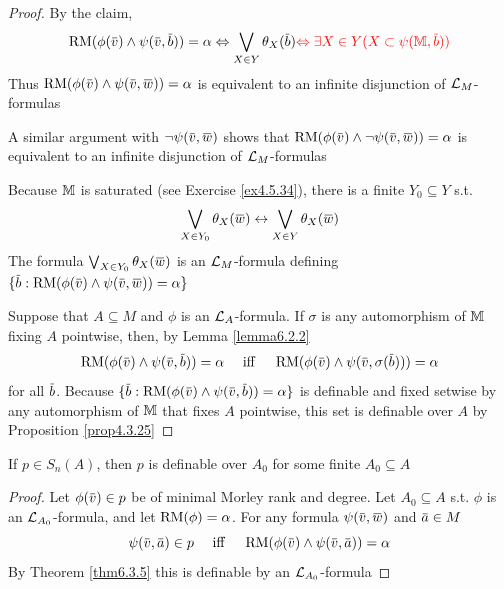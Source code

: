 \documentclass[11pt]{article}
\begin{document}
\begin{proof}
By the claim,
\begin{equation*}
\RM(\phi(\barv)\wedge\psi(\barv,\barb))=\alpha\Leftrightarrow\bigvee_{X\in Y}\theta_X(\barb)\wu{\Leftrightarrow\exists X\in Y(X\subset\psi(\M,\barb))}
\end{equation*}
Thus \(\RM(\phi(\barv)\wedge\psi(\barv,\barw))=\alpha\) is equivalent to an infinite disjunction
of \(\mathcal{L}_M\)-formulas

A similar argument with \(\neg\psi(\barv,\barw)\) shows that \(\RM(\phi(\barv)\wedge\neg\psi(\barv,\barw))=\alpha\) is
equivalent to an infinite disjunction of \(\mathcal{L}_M\)-formulas

Because \(\mathbb{M}\) is saturated (see Exercise \ref{ex4.5.34}), there is a finite \(Y_0\subseteq Y\) s.t.
\begin{equation*}
\bigvee_{X\in Y_0}\theta_X(\barw)\leftrightarrow\bigvee_{X\in Y}\theta_X(\barw)
\end{equation*}
The formula \(\bigvee_{X\in Y_0}\theta_X(\barw)\) is an \(\mathcal{L}_M\)-formula
defining \(\{\barb:\RM(\phi(\barv)\wedge\psi(\barv,\barw))=\alpha\}\)

Suppose that \(A\subseteq M\) and \(\phi\) is an \(\mathcal{L}_A\)-formula. If \(\sigma\) is any automorphism of \(\mathbb{M}\)
fixing \(A\) pointwise, then, by Lemma \ref{lemma6.2.2}
\begin{equation*}
\RM(\phi(\barv)\wedge\psi(\barv,\barb))=\alpha \quad\text{ iff }\quad \RM(\phi(\barv)\wedge\psi(\barv,\sigma(\barb)))=\alpha
\end{equation*}
for all \(\barb\). Because \(\{\barb:\RM(\phi(\barv)\wedge\psi(\barv,\barb))=\alpha\}\) is definable and fixed
setwise by any automorphism of \(\mathbb{M}\) that fixes \(A\) pointwise, this set is definable
over \(A\) by Proposition \ref{prop4.3.25}
\end{proof}

\begin{corollary}[]
If \(p\in S_n(A)\), then \(p\) is definable over \(A_0\) for some finite \(A_0\subseteq A\)
\end{corollary}

\begin{proof}
Let \(\phi(\barv)\in p\) be of minimal Morley rank and degree. Let \(A_0\subseteq A\) s.t. \(\phi\) is
an \(\mathcal{L}_{A_0}\)-formula, and let \(\operatorname{RM}(\phi)=\alpha\). For any formula \(\psi(\barv,\barw)\)
and \(\bara\in M\)
\begin{equation*}
\psi(\barv,\bara)\in p \quad\text{ iff }\quad
\RM(\phi(\barv)\wedge\psi(\barv,\bara))=\alpha
\end{equation*}
By Theorem \ref{thm6.3.5} this is definable by an \(\mathcal{L}_{A_0}\)-formula
\end{proof}
\end{document}
